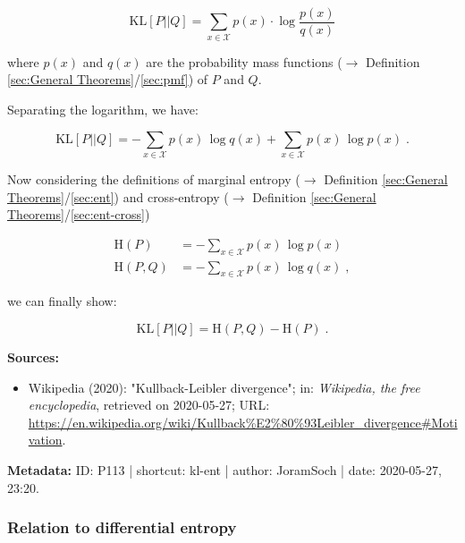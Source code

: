 \documentclass[a4paper,12pt,twoside]{book}
\begin{document}
\begin{equation} \label{eq:kl-ent-KL}
\mathrm{KL}[P||Q] = \sum_{x \in \mathcal{X}} p(x) \cdot \log \frac{p(x)}{q(x)}
\end{equation}

where $p(x)$ and $q(x)$ are the probability mass functions ($\rightarrow$ Definition \ref{sec:General Theorems}/\ref{sec:pmf}) of $P$ and $Q$.

Separating the logarithm, we have:

\begin{equation} \label{eq:kl-ent-KL-dev}
\mathrm{KL}[P||Q] = - \sum_{x \in \mathcal{X}} p(x) \, \log q(x) + \sum_{x \in \mathcal{X}} p(x) \, \log p(x) \; .
\end{equation}

Now considering the definitions of marginal entropy ($\rightarrow$ Definition \ref{sec:General Theorems}/\ref{sec:ent}) and cross-entropy ($\rightarrow$ Definition \ref{sec:General Theorems}/\ref{sec:ent-cross})

\begin{equation} \label{eq:kl-ent-ME-CE}
\begin{split}
\mathrm{H}(P) &= - \sum_{x \in \mathcal{X}} p(x) \, \log p(x) \\
\mathrm{H}(P,Q) &= - \sum_{x \in \mathcal{X}} p(x) \, \log q(x) \; ,
\end{split}
\end{equation}

we can finally show:

\begin{equation} \label{eq:kl-ent-KL-qed}
\mathrm{KL}[P||Q] = \mathrm{H}(P,Q) - \mathrm{H}(P) \; .
\end{equation}


\vspace{1em}
\textbf{Sources:}
\begin{itemize}
\item Wikipedia (2020): "Kullback-Leibler divergence"; in: \textit{Wikipedia, the free encyclopedia}, retrieved on 2020-05-27; URL: \url{https://en.wikipedia.org/wiki/Kullback%E2%80%93Leibler_divergence#Motivation}.
\end{itemize}


\vspace{1em}
\textbf{Metadata:} ID: P113 | shortcut: kl-ent | author: JoramSoch | date: 2020-05-27, 23:20.
\vspace{1em}



\subsubsection[\textbf{Relation to differential entropy}]{Relation to differential entropy} \label{sec:kl-dent}
\setcounter{equation}{0}
\end{document}

